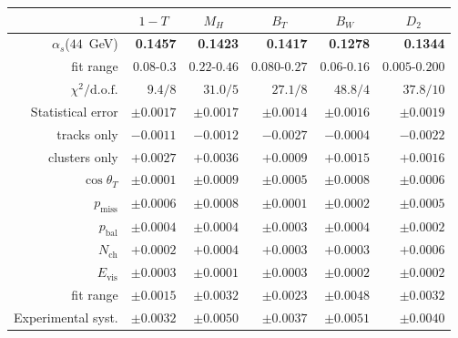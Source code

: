 \documentclass[12pt,a4paper,twoside]{article}
\newcommand{\as}     {\ensuremath{\alpha_s}}
\newcommand{\bt}     {\ensuremath{B_T}}
\newcommand{\bw}     {\ensuremath{B_W}}
\newcommand{\mh}     {\ensuremath{M_H}}
\newcommand{\thr}    {\ensuremath{1-T}}
\newcommand{\chisqd} {\ensuremath{\chi^2/\mathrm{d.o.f.}}}
\newcommand{\dtwo}   {\ensuremath{D_2}}
\begin{document}
\newpage

\begin{table}[!htb]
\vspace*{-7mm}
\begin{center}
\begin{tabular}{|r||r|r|r|r|r|}   \hline
 &\multicolumn{1}{c|}{\thr} &\multicolumn{1}{c|}{\mh}
 &\multicolumn{1}{c|}{\bt}  &\multicolumn{1}{c|}{\bw}
 &\multicolumn{1}{c|}{\dtwo}     \\
\hline\hline
\as($44$~GeV)     &\bf 0.1457  &\bf 0.1423  &\bf 0.1417  &\bf 0.1278  &\bf 0.1344   \\
\hline\hline
fit range         &$0.08$-$0.3$ 
                               & $0.22$-$0.46$ 
                                            & $0.080$-$0.27$ 
                                                         & $0.06$-$0.16$
                                                                  & $0.005$-$0.200$ \\
\hline\hline
\chisqd           & $9.4/8$    & $31.0/5$   & $27.1/8$   & $48.8/4$   & $37.8/10$    \\
\hline\hline
Statistical error &$\pm 0.0017$&$\pm 0.0017$&$\pm 0.0014$&$\pm 0.0016$&$\pm 0.0019$
\\ \hline\hline
tracks only       &  $-0.0011$ &  $-0.0012$ &  $-0.0027$ &  $-0.0004$ &  $-0.0022$  \\
\hline
clusters only     &  $+0.0027$ &  $+0.0036$ &  $+0.0009$ &  $+0.0015$ &  $+0.0016$  \\
\hline
$\cos\theta_T $ 
                  &$\pm 0.0001$&$\pm 0.0009$&$\pm 0.0005$&$\pm 0.0008$&$\pm 0.0006$  \\
\hline
$p_{\mathrm{miss}} $ 
                  &$\pm 0.0006$&$\pm 0.0008$&$\pm 0.0001$&$\pm 0.0002$&$\pm 0.0005$  \\
\hline
$p_{\mathrm{bal}} $ 
                  &$\pm 0.0004$&$\pm 0.0004$&$\pm 0.0003$&$\pm 0.0004$&$\pm 0.0002$  \\
\hline
$N_{\mathrm{ch}} $ 
                  &  $+ 0.0002$&  $+ 0.0004$&  $+ 0.0003$&  $+ 0.0003$&  $+ 0.0006$  \\
\hline
$E_{\mathrm{vis}} $ 
                  &$\pm 0.0003$&$\pm 0.0001$&$\pm 0.0003$&$\pm 0.0002$&$\pm 0.0002$  \\
\hline
fit range 
                  &$\pm 0.0015$&$\pm 0.0032$&$\pm 0.0023$&$\pm 0.0048$&$\pm 0.0032$  \\
\hline\hline
Experimental syst.&$\pm 0.0032$&$\pm 0.0050$&$\pm 0.0037$&$\pm 0.0051$&$\pm 0.0040$ \\

\end{tabular}
\end{center}
\end{table}
\end{document}
